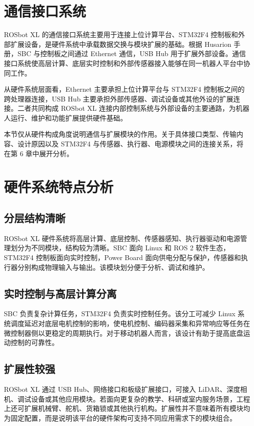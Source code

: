 \documentclass[UTF8,a4paper,12pt]{ctexrep}
\begin{document}
\section{通信接口系统}

ROSbot XL 的通信接口系统主要用于连接上位计算平台、STM32F4 控制板和外部扩展设备，是硬件系统中承载数据交换与模块扩展的基础。根据 Husarion 手册，SBC 与控制板之间通过 Ethernet 通信，USB Hub 用于扩展外部设备。通信接口系统使高层计算、底层实时控制和外部传感器接入能够在同一机器人平台中协同工作。

从硬件系统层面看，Ethernet 主要承担上位计算平台与 STM32F4 控制板之间的跨处理器连接，USB Hub 主要承担外部传感器、调试设备或其他外设的扩展连接。二者共同构成 ROSbot XL 连接内部控制系统与外部设备的主要通路，为机器人运行、维护和功能扩展提供硬件基础。

本节仅从硬件构成角度说明通信与扩展模块的作用。关于具体接口类型、传输内容、设计原因以及 STM32F4 与传感器、执行器、电源模块之间的连接关系，将在第 6 章中展开分析。

\section{硬件系统特点分析}

\subsection{分层结构清晰}

ROSbot XL 硬件系统将高层计算、底层控制、传感器感知、执行器驱动和电源管理划分为不同模块，结构较为清晰。SBC 面向 Linux 和 ROS 2 软件生态，STM32F4 控制板面向实时控制，Power Board 面向供电分配与保护，传感器和执行器分别构成物理输入与输出。该模块划分便于分析、调试和维护。

\subsection{实时控制与高层计算分离}

SBC 负责复杂计算任务，STM32F4 负责实时控制任务。该分工可减少 Linux 系统调度延迟对底层电机控制的影响，使电机控制、编码器采集和异常响应等任务在微控制器侧以更稳定的周期执行。对于移动机器人而言，该设计有助于提高底盘运动控制的可靠性。

\subsection{扩展性较强}

ROSbot XL 通过 USB Hub、网络接口和板级扩展接口，可接入 LiDAR、深度相机、调试设备或其他应用模块。若面向更复杂的教学、科研或室内服务场景，工程上还可扩展机械臂、舵机、货箱锁或其他执行机构。扩展性并不意味着所有模块均为固定配置，而是说明该平台的硬件架构可支持不同应用需求下的模块组合。
\end{document}
